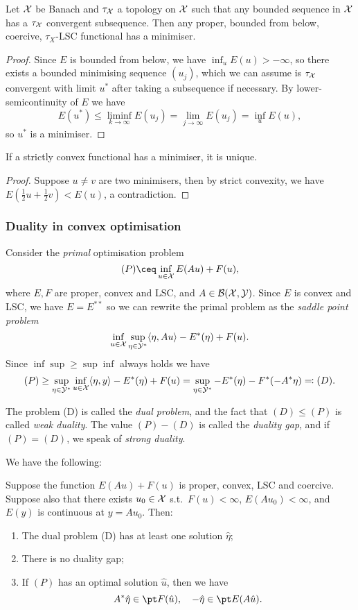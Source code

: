 \begin{theorem} \label{thm:direct_method}
	Let $\mathcal X$ be Banach and $\tau_\mathcal X$ a topology on $\mathcal X$ such that any bounded sequence in $\mathcal X$ has a $\tau_\mathcal X$ convergent subsequence. Then any proper, bounded from below, coercive, $\tau_X$-LSC functional has a minimiser.  
\end{theorem}

\begin{proof}
	Since $E$ is bounded from below, we have $\inf_u E(u) > -\infty$, so there exists a bounded minimising sequence $(u_j)$, which we can assume is $\tau_\mathcal X$ convergent with limit $u^*$ after taking a subsequence if necessary. By lower-semicontinuity of $E$ we have
	\[
	E(u^*) \leq \liminf_{k\to\infty} E(u_j) = \lim_{j\to\infty} E(u_j) = \inf_u E(u),
	\]
	so $u^*$ is a minimiser. 
\end{proof}

\begin{theorem}
	If a strictly convex functional has a minimiser, it is unique. 
\end{theorem}

\begin{proof}
	Suppose $u \neq v$ are two minimisers, then by strict convexity, we have $E(\frac12 u + \frac12 v) < E(u)$, a contradiction. 
\end{proof}

\subsubsection{Duality in convex optimisation}
Consider the \emph{primal} optimisation problem 
\[
(P) \ceq \inf_{u \in \XX} E(Au) + F(u),
\]
where $E, F$ are proper, convex and LSC, and $A \in \mathcal B(\mathcal X, \mathcal Y)$. Since $E$ is convex and LSC, we have $E = E^{**}$ so we can rewrite the primal problem as the \emph{saddle point problem}
\[
\inf_{u \in \mathcal X} \sup_{\eta \in \mathcal Y^*} \langle\eta, Au\rangle - E^*(\eta) + F(u).
\]
Since $\inf\sup \geq \sup\inf$ always holds we have
\[
(P) \geq \sup_{\eta \in \mathcal Y^*} \inf_{u \in \mathcal X} \langle\eta, y\rangle - E^*(\eta) + F(u) = \sup_{\eta \in \mathcal Y^*} -E^*(\eta) - F^*(-A^*\eta) \eqqcolon (D). 
\] 

The problem (D) is called the \emph{dual problem}, and the fact that $(D) \leq (P)$ is called \emph{weak duality}. The value $(P) - (D)$ is called the \emph{duality gap}, and if $(P) = (D)$, we speak of \emph{strong duality}. 

We have the following:
\begin{theorem}
	Suppose the function $E(Au) + F(u)$ is proper, convex, LSC and coercive. Suppose also that there exists $u_0 \in \mathcal X$ s.t.\ $F(u)< \infty$, $E(Au_0) < \infty$, and $E(y)$ is continuous at $y = A u_0$. Then:
	\begin{enumerate}
		\item The dual problem (D) has at least one solution $\hat\eta$;
		\item There is no duality gap;
		\item If $(P)$ has an optimal solution $\hat u$, then we have
		\[
		A^*\hat\eta \in \pt F(\hat u), \quad -\hat\eta \in \pt E(A\hat u). 
		\]
	\end{enumerate}
\end{theorem}


